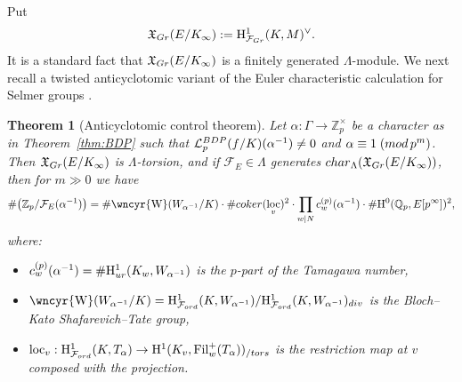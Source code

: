 \documentclass[10pt,reqno]{amsart}
\numberwithin{equation}{section}
\theoremstyle{plain}
\newtheorem{thm}{Theorem}[subsection] %
\theoremstyle{definition}
\theoremstyle{definition}
\theoremstyle{plain}
\theoremstyle{plain}
\theoremstyle{plain}
\theoremstyle{plain}
\theoremstyle{plain}
\theoremstyle{plain}
\newcommand{\Fil}{\mathrm{Fil}}
\newcommand{\al}{\alpha} %
\newcommand{\Z}{\mathbb{Z}}
\newcommand{\Q}{\mathbb{Q}}
\newcommand{\X}{\mathfrak{X}}
\newcommand{\sha}{\text{\wncyr{W}}}
\DeclareMathOperator{\loc}{loc}
\newcommand{\Lcal}{\mathcal{L}}
\newcommand{\Fcal}{\mathcal{F}}
\newcommand{\rH}{\mathrm{H}}
\begin{document}
Put
\begin{align*}
\X_{\rm Gr}(E/K_\infty):=\rH^1_{\Fcal_{\rm Gr}}(K, M)^{\vee}.
\end{align*}
It is a standard fact that $\X_{\rm Gr}(E/K_\infty)$ is a finitely generated $\Lambda$-module. 
%
We next recall a twisted anticyclotomic variant of the Euler characteristic calculation for Selmer groups \cite[\S{4}]{greenberg-cetraro}. %

\begin{thm}[Anticyclotomic control theorem]\label{controlthm}
Let $\al:\Gamma\rightarrow\Z_p^\times$ be a character as in Theorem~\ref{thm:BDP} such that $\Lcal_p^{\rm BDP}(f/K)(\al^{-1})\neq 0$ and $\alpha\equiv 1\;({\rm mod}\,p^m)$. Then $\X_{\rm Gr}(E/K_\infty)$ is $\Lambda$-torsion, and if $\Fcal_E\in\Lambda$ generates ${\rm char}_\Lambda(\mathfrak{X}_{\rm Gr}(E/K_\infty))$, then for $m\gg 0$ we have
\[
\#\bigl(\Z_p /\Fcal_E(\al^{-1})\bigr) = 
\#\sha(W_{\al^{-1}}/K)\cdot \#{\rm coker}(\loc_{v})^2 \cdot \prod_{w\mid N}c_w^{(p)}(\al^{-1})\cdot\#\rH^0(\Q_p,E[p^\infty])^2,
\]
where: 
\begin{itemize}
\item $c_w^{(p)}(\al^{-1})=\#\rH^1_{\rm ur}(K_w,W_{\al^{-1}})$ %
is the $p$-part of the Tamagawa number, %
\item $\sha(W_{\al^{-1}}/K)=\rH^1_{\Fcal_{\rm ord}}(K,W_{\al^{-1}})/\rH^1_{\Fcal_{\rm ord}}(K, W_{\al^{-1}})_{\rm div}$ is the Bloch--Kato Shafarevich--Tate group, %
\item $\loc_{v}:\rH^1_{\Fcal_{\rm ord}}(K,T_{\al})\to \rH^1(K_v, \Fil_w^+(T_{\al}))_{/\rm tors}$ is the restriction map at $v$ composed with the projection.
\end{itemize}
\end{thm}
\end{document}
